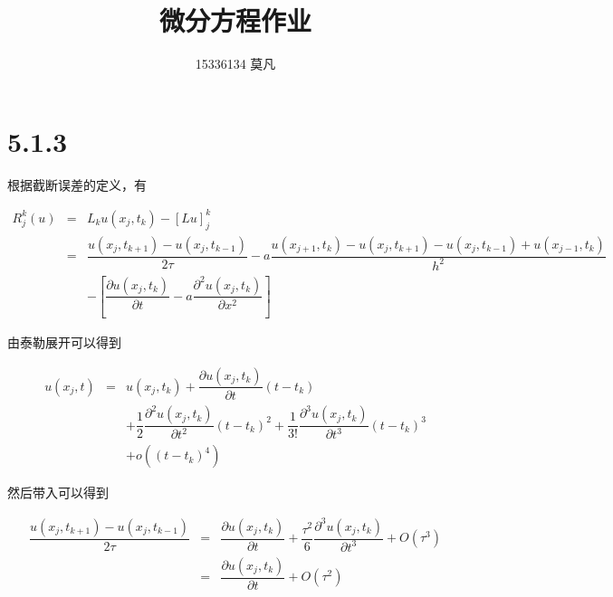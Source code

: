 \documentclass[9pt, a4paper]{article}
\begin{document}
\title{微分方程作业}
\author{15336134 莫凡}
\maketitle

\section*{5.1.3}

根据截断误差的定义，有
\begin{spacing}{2.3}
\begin{equation}
	\begin{array}{rcl}
		R_j^k(u) & = & L_ku(x_j,t_k)-[Lu]_j^k\\
				 & = & \dfrac{u(x_j,t_{k+1})-u(x_j,t_{k-1})}{2\tau}-a\dfrac{u(x_{j+1},t_k)-u(x_j,t_{k+1})-u(x_j,t_{k-1})+u(x_{j-1},t_{k})}{h^2}\\
				 &   & - \left[\dfrac{\partial u(x_j,t_k)}{\partial t}-a\dfrac{\partial^2 u(x_j,t_k)}{\partial x^2}\right]
	\end{array}
\end{equation}
\end{spacing}

由泰勒展开可以得到

\begin{spacing}{2.3}
\begin{equation}
	\begin{array}{rcl}
		u(x_j,t) & = & u(x_j,t_k) + \dfrac{\partial u(x_j, t_k)}{\partial t}(t-t_k)\\
				 &   & + \dfrac{1}{2}\dfrac{\partial^2 u(x_j,t_k)}{\partial t^2}(t-t_k)^2
					   + \dfrac{1}{3!}\dfrac{\partial^3 u(x_j,t_k)}{\partial t^3}(t-t_k)^3\\
				 &   & + o\left((t-t_k)^4\right)
	\end{array}
\end{equation}
\end{spacing}

然后带入可以得到
\begin{spacing}{2.3}
\begin{equation}
	\begin{array}{rcl}
		\dfrac{u(x_j,t_{k+1})-u(x_j,t_{k-1})}{2\tau}&=&\dfrac{\partial u(x_j,t_k)}{\partial t}+\dfrac{\tau^2}{6}\dfrac{\partial^3u(x_j,t_k)}{\partial t^3}+O(\tau^3)\\
		& = & \dfrac{\partial u(x_j,t_k)}{\partial t}+O(\tau^2)
	\end{array}
\end{equation}
\end{spacing}
\end{document}
